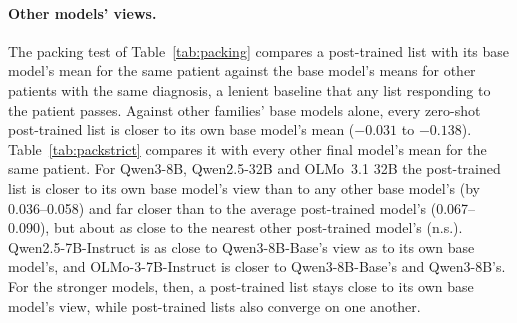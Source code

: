 \documentclass[11pt]{article}
\begin{document}
\paragraph{Other models' views.} The packing test of Table~\ref{tab:packing} compares a post-trained list with its base model's mean for the same patient against the base model's means for other patients with the same diagnosis, a lenient baseline that any list responding to the patient passes. Against other families' base models alone, every zero-shot post-trained list is closer to its own base model's mean ($-0.031$ to $-0.138$). Table~\ref{tab:packstrict} compares it with every other final model's mean for the same patient. For Qwen3-8B, Qwen2.5-32B and OLMo~3.1 32B the post-trained list is closer to its own base model's view than to any other base model's (by 0.036--0.058) and far closer than to the average post-trained model's (0.067--0.090), but about as close to the nearest other post-trained model's (n.s.). Qwen2.5-7B-Instruct is as close to Qwen3-8B-Base's view as to its own base model's, and OLMo-3-7B-Instruct is closer to Qwen3-8B-Base's and Qwen3-8B's. For the stronger models, then, a post-trained list stays close to its own base model's view, while post-trained lists also converge on one another.
\end{document}
